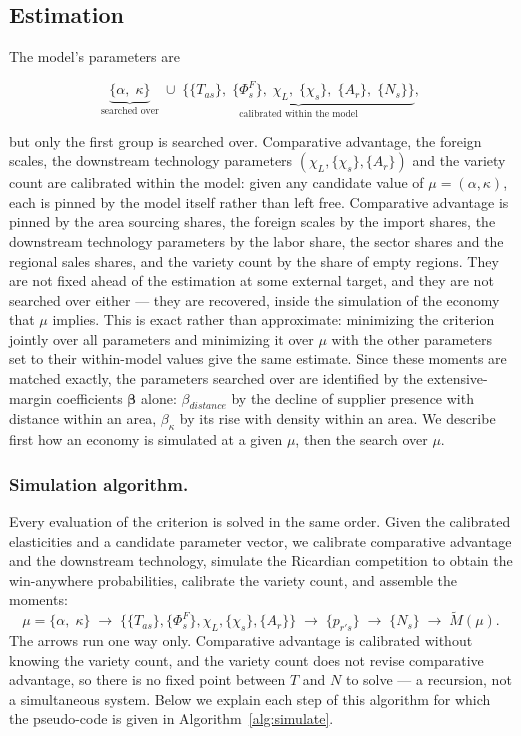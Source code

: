 \subsection{Estimation}
\label{app:model-estimation}

The model's parameters are

\begin{equation}
\underbrace{\big\{\alpha,\;\kappa\big\}}_{\text{searched over}}
\;\cup\;
\underbrace{\big\{\{T_{as}\},\;\{\Phi^F_s\},\;\chi_{L},\;\{\chi_{s}\},\;\{A_{r}\},\;\{N_{s}\}\big\}}_{\text{calibrated within the model}},
\label{eq:app-param-split}
\end{equation}

but only the first group is searched over. Comparative advantage, the foreign scales, the downstream technology parameters $(\chi_L,\{\chi_s\},\{A_r\})$ and the variety count are calibrated within the model: given any candidate value of $\mu=(\alpha,\kappa)$, each is pinned by the model itself rather than left free. Comparative advantage is pinned by the area sourcing shares, the foreign scales by the import shares, the downstream technology parameters by the labor share, the sector shares and the regional sales shares, and the variety count by the share of empty regions. They are not fixed ahead of the estimation at some external target, and they are not searched over either --- they are recovered, inside the simulation of the economy that $\mu$ implies. This is exact rather than approximate: minimizing the criterion jointly over all parameters and minimizing it over $\mu$ with the other parameters set to their within-model values give the same estimate. Since these moments are matched exactly, the parameters searched over are identified by the extensive-margin coefficients $\boldsymbol\beta$ alone: $\beta_{distance}$ by the decline of supplier presence with distance within an area, $\beta_\kappa$ by its rise with density within an area. We describe first how an economy is simulated at a given $\mu$, then the search over $\mu$.

\subsubsection{Simulation algorithm.} Every evaluation of the criterion is solved in the same order. Given the calibrated elasticities and a candidate parameter vector, we calibrate comparative advantage and the downstream technology, simulate the Ricardian competition to obtain the win-anywhere probabilities, calibrate the variety count, and assemble the moments:
\begin{equation}
\mu=\big\{\alpha,\;\kappa\big\}
\;\longrightarrow\;\big\{\{T_{as}\},\{\Phi^F_s\},\chi_L,\{\chi_s\},\{A_r\}\big\}
\;\longrightarrow\;\{p_{r's}\}
\;\longrightarrow\;\{N_{s}\}
\;\longrightarrow\;\tilde M(\mu) .
\label{eq:app-recursion}
\end{equation}
The arrows run one way only. Comparative advantage is calibrated without knowing the variety count, and the variety count does not revise comparative advantage, so there is no fixed point between $T$ and $N$ to solve --- a recursion, not a simultaneous system. Below we explain each step of this algorithm for which the pseudo-code is given in Algorithm~\ref{alg:simulate}.

